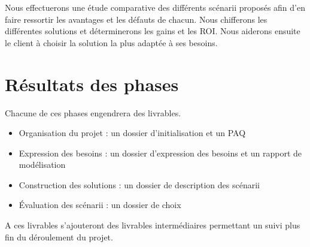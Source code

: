 Nous effectuerons une \'etude comparative des diff\'erents sc\'enarii propos\'es afin d'en faire ressortir les avantages et les d\'efauts de chacun.
Nous chifferons les diff\'erentes solutions et d\'eterminerons les gains et les ROI.
Nous aiderons ensuite le client \`a choisir la solution la plus adapt\'ee \`a ses besoins.


\section{R\'esultats des phases}

Chacune de ces phases engendrera des livrables.

\begin{itemize}
 \item Organisation du projet : un dossier d'initialisation et un PAQ
 \item Expression des besoins : un dossier d'expression des besoins et un rapport de mod\'elisation
 \item Construction des solutions : un dossier de description des sc\'enarii
 \item \'Evaluation des sc\'enarii : un dossier de choix
\end{itemize}

A ces livrables s'ajouteront des livrables interm\'ediaires permettant un suivi plus fin du d\'eroulement du projet.
